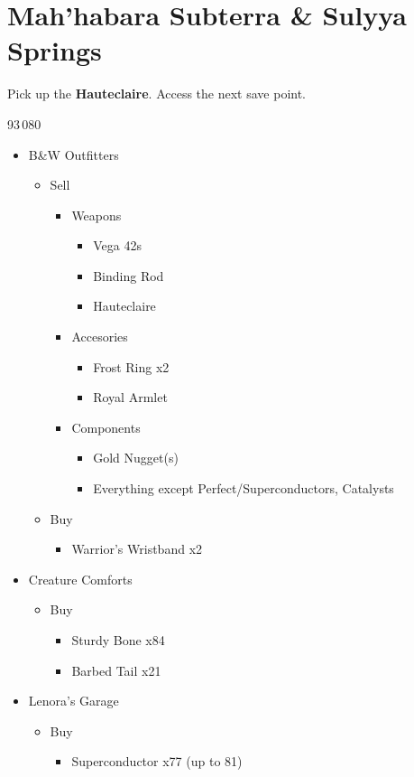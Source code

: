 \chapter{Mah'habara Subterra \& Sulyya Springs}

Pick up the \textbf{Hauteclaire}.
Access the next save point.

\begin{shop}{93\,080}
	\begin{itemize}
		\item B\&W Outfitters
			\begin{itemize}
				\item Sell
					\begin{itemize}
						\item Weapons
							\begin{itemize}
								\item Vega 42s
								\item Binding Rod
								\item Hauteclaire
							\end{itemize}
						\item Accesories
							\begin{itemize}
								\item Frost Ring x2
								\item Royal Armlet
							\end{itemize}
						\item Components
							\begin{itemize}
								\item Gold Nugget(s)
								\item Everything except Perfect/Superconductors, Catalysts
							\end{itemize}
					\end{itemize}
				\item Buy
					\begin{itemize}
						\item Warrior's Wristband x2
					\end{itemize}
			\end{itemize}
		\item Creature Comforts
			\begin{itemize}
				\item Buy
					\begin{itemize}
						\item Sturdy Bone x84
						\item Barbed Tail x21
					\end{itemize}
			\end{itemize}
		\item Lenora's Garage
			\begin{itemize}
				\item Buy
					\begin{itemize}
						\item Superconductor x77 (up to 81)
					\end{itemize}
			\end{itemize}		
	\end{itemize}
\end{shop}
